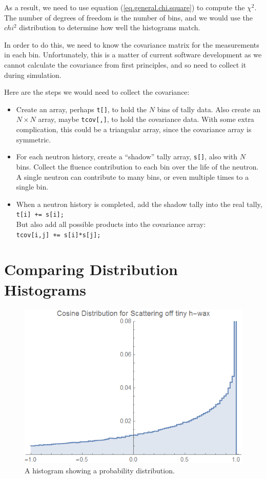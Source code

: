 \documentclass[letterpaper,12pt]{article}
\begin{document}
As a result, we need to use equation (\ref{eq.general.chi.square}) to compute the $\chi^2$. The number of degrees of freedom is the number of bins, and we would use the $chi^2$ distribution to determine how well the histograms match.

In order to do this, we need to know the covariance matrix for the measurements in each bin.  Unfortunately, this is a matter of current software development as we cannot calculate the covariance from first principles, and so need to collect it during simulation.

Here are the steps we would need to collect the covariance:

\begin{itemize}
	\item Create an array, perhaps \texttt{t[]}, to hold the $N$ bins of tally data. Also create an $N\times N$ array, maybe \texttt{tcov[,]}, to hold the covariance data. With some extra complication, this could be a triangular array, since the covariance array is symmetric.
	\item For each neutron history, create a ``shadow'' tally array, \texttt{s[]}, also with $N$ bins. Collect the fluence contribution to each bin over the life of the neutron. A single neutron can contribute to many bins, or even multiple times to a single bin.
	\item When a neutron history is completed, add the shadow tally into the real tally,\\ \texttt{t[i] += s[i];} \\But also add all possible products into the covariance array:\\ \texttt{tcov[i,j] += s[i]*s[j];}
\end{itemize}

\section{Comparing Distribution Histograms}

\begin{figure}[ht] 
	\centering	\includegraphics[width=0.7\columnwidth]{CosineDistributionMCNP}
	\caption{
		\label{fig.cosine}
		A histogram showing a probability distribution.
	}
\end{figure}
\end{document}
